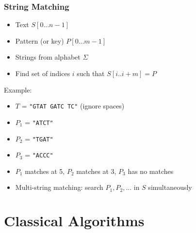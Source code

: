 \documentclass[
	11pt, %
]{beamer}
\begin{document}


\begin{frame}
    \frametitle{String Matching}
    \begin{itemize}
        \item Text $S[0...n-1]$
        \item Pattern (or key) $P[0...m-1]$
        \item Strings from alphabet $\Sigma$
        \item Find set of indices $i$ such that $S[i..i+m] = P$
    \end{itemize}
    Example:
    \begin{itemize}
        \item $T$ = \texttt{"GTAT GATC TC"} (ignore spaces)
        \item $P_1$ = \texttt{"ATCT"}
        \item $P_2$ = \texttt{"TGAT"}
        \item $P_3$ = \texttt{"ACCC"}
        \item $P_1$ matches at 5, $P_2$ matches at 3, $P_3$ has no matches
    \end{itemize}
    \bigskip
    \begin{itemize}
        \item Multi-string matching: search $P_1, P_2, ...$ in $S$ simultaneously
    \end{itemize}
\end{frame}


\section{Classical Algorithms}
\end{document}
